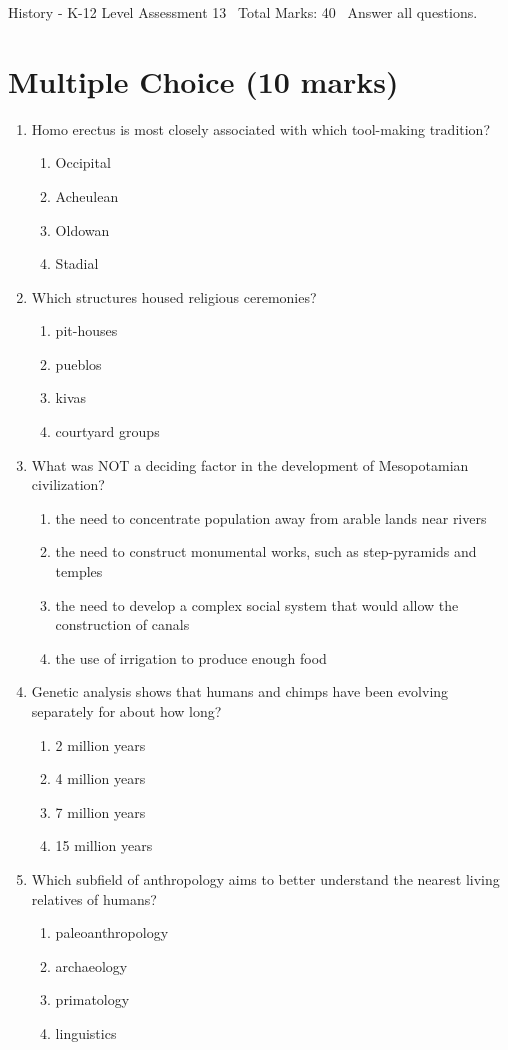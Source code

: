 \documentclass[12pt]{article}
\begin{document}
\begin{center}
History - K-12 Level Assessment 13 \
Total Marks: 40 \
Answer all questions.
\end{center}

\section*{Multiple Choice (10 marks)}
\begin{enumerate}[label=\arabic*.]
\item Homo erectus is most closely associated with which tool-making tradition?
\begin{enumerate}[label=(\alph*)]
    \item Occipital
    \item Acheulean
    \item Oldowan
    \item Stadial
\end{enumerate}
\item Which structures housed religious ceremonies?
\begin{enumerate}[label=(\alph*)]
    \item pit-houses
    \item pueblos
    \item kivas
    \item courtyard groups
\end{enumerate}
\item What was NOT a deciding factor in the development of Mesopotamian civilization?
\begin{enumerate}[label=(\alph*)]
    \item the need to concentrate population away from arable lands near rivers
    \item the need to construct monumental works, such as step-pyramids and temples
    \item the need to develop a complex social system that would allow the construction of canals
    \item the use of irrigation to produce enough food
\end{enumerate}
\item Genetic analysis shows that humans and chimps have been evolving separately for about how long?
\begin{enumerate}[label=(\alph*)]
    \item 2 million years
    \item 4 million years
    \item 7 million years
    \item 15 million years
\end{enumerate}
\item Which subfield of anthropology aims to better understand the nearest living relatives of humans?
\begin{enumerate}[label=(\alph*)]
    \item paleoanthropology
    \item archaeology
    \item primatology
    \item linguistics
\end{enumerate}
\end{enumerate}
\end{document}
